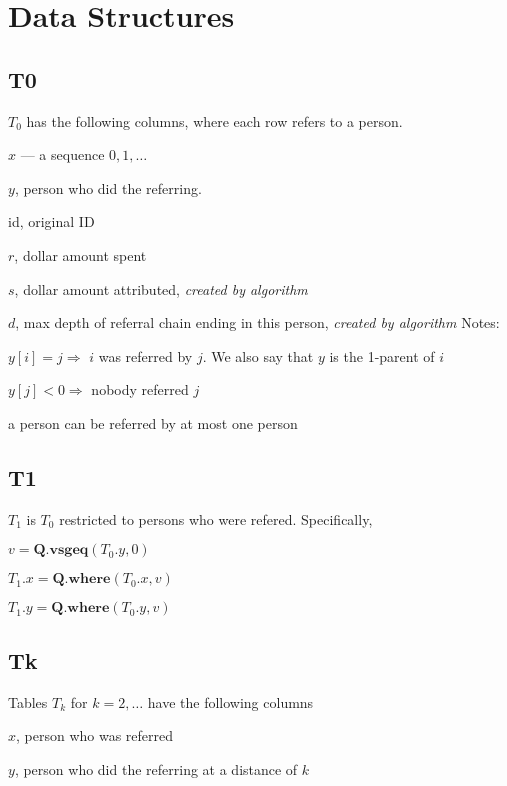 \section{Data Structures}
\subsection{T0}

\(T_0\) has the following columns, where each row refers to a person.
\be
\item \(x\) --- a sequence \(0, 1, \ldots\)
\item \(y\), person who did the referring. 
\item id, original ID 
\item \(r\), dollar amount spent 
\item \(s\), dollar amount attributed, {\em created by algorithm}
\item \(d\), max depth of referral chain ending in this person, {\em created by algorithm}
\ee
Notes:
\bi
\item \(y[i] = j \Rightarrow\) \(i\) was referred by \(j\). 
We also say that \(y\) is the 1-parent of \(i\)
\item \(y[j] < 0 \Rightarrow \) nobody referred \(j\)
\item a person can be referred by at most one person 
\ei

\subsection{T1}

\(T_1\) is \(T_0\) restricted to persons who were refered. Specifically,
\bi
\item \(v = \mathbf{Q.vsgeq}(T_0.y, 0)\)
\item \(T_1.x = \mathbf{Q.where}(T_0.x, v)\)
\item \(T_1.y = \mathbf{Q.where}(T_0.y, v)\)
\ei

\subsection{Tk}

Tables \(T_k\) for \(k =  2, \ldots\) have the following columns
\be
\item \(x\), person who was referred
\item \(y\), person who did the referring at a distance of \(k\)
\ee

